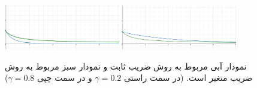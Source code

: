 \documentclass[a4paper, 12pt]{article}
\begin{document}
\begin{enumerate}[A)]
	\begin{figure}[H]
		\centering
		\includegraphics[width=0.45\textwidth]{constant.png}
		\includegraphics[width=0.45\textwidth]{new.png}
		\caption{
			{\scriptsize
		نمودار آبی مربوط به روش ضریب ثابت و نمودار سبز مربوط به روش ضریب متغیر است. (در سمت راستی $\gamma=0.2$ و در سمت چپی $\gamma=0.8$)	
		}
		}
	\end{figure}
\end{enumerate}

\pagebreak
\end{document}
